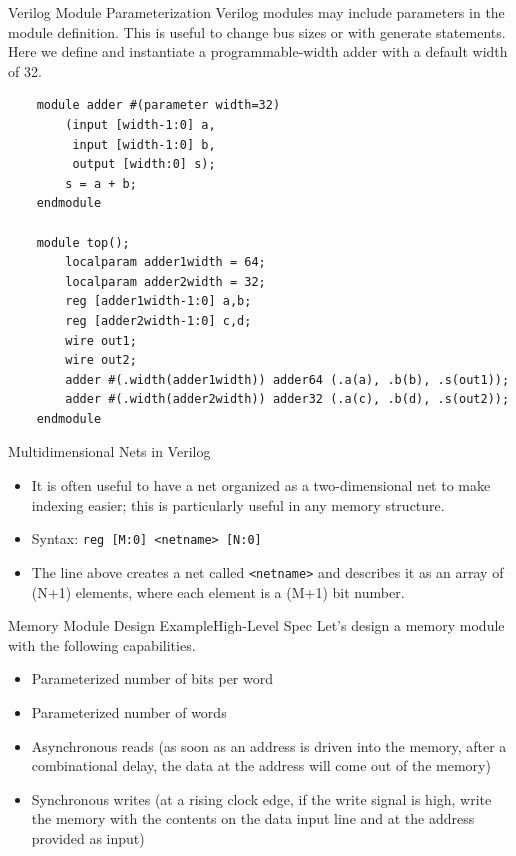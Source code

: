 \documentclass{beamer}
\begin{document}
\begin{frame}[fragile]{Verilog Module Parameterization}
	Verilog modules may include parameters in the module definition.
	This is useful to change bus sizes or with generate statements.
	Here we define and instantiate a programmable-width adder with a default width of 32.

	\begin{verbatim}
	module adder #(parameter width=32)
		(input [width-1:0] a,
		 input [width-1:0] b,
		 output [width:0] s);
		s = a + b;
	endmodule

	module top();
		localparam adder1width = 64;
		localparam adder2width = 32;
		reg [adder1width-1:0] a,b;
		reg [adder2width-1:0] c,d;
		wire out1;
		wire out2;
		adder #(.width(adder1width)) adder64 (.a(a), .b(b), .s(out1));
		adder #(.width(adder2width)) adder32 (.a(c), .b(d), .s(out2));
	endmodule
	\end{verbatim}

\end{frame}

\begin{frame}{Multidimensional Nets in Verilog}
	\begin{itemize}
		\item It is often useful to have a net organized as a two-dimensional net to make indexing easier; this is particularly useful in any memory structure.
		\item Syntax: \texttt{reg [M:0] <netname> [N:0]}
		\item The line above creates a net called \texttt{<netname>} and describes it as an array of (N+1) elements, where each element is a (M+1) bit number.
	\end{itemize}
\end{frame}

\begin{frame}{Memory Module Design Example}{High-Level Spec}
	Let's design a memory module with the following capabilities.
	\begin{itemize}
		\item Parameterized number of bits per word
		\item Parameterized number of words
		\item Asynchronous reads (as soon as an address is driven into the memory, after a combinational delay, the data at the address will come out of the memory)
		\item Synchronous writes (at a rising clock edge, if the write signal is high, write the memory with the contents on the data input line and at the address provided as input)
	\end{itemize}
\end{frame}
\end{document}

